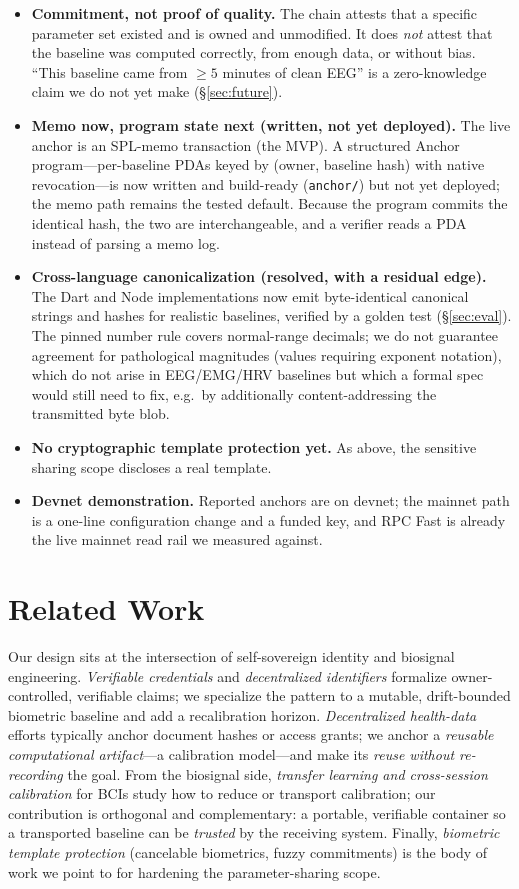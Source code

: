 \documentclass[10pt,twocolumn]{article}
\newcommand{\code}[1]{\texttt{\small #1}}
\begin{document}
\begin{itemize}
\item \textbf{Commitment, not proof of quality.} The chain attests that a
  specific parameter set existed and is owned and unmodified. It does \emph{not}
  attest that the baseline was computed correctly, from enough data, or without
  bias. ``This baseline came from $\ge\!5$ minutes of clean EEG'' is a
  zero-knowledge claim we do not yet make (\S\ref{sec:future}).
\item \textbf{Memo now, program state next (written, not yet deployed).} The
  live anchor is an SPL-memo transaction (the MVP). A structured Anchor
  program---per-baseline PDAs keyed by (owner, baseline hash) with native
  revocation---is now written and build-ready (\code{anchor/}) but not yet
  deployed; the memo path remains the tested default. Because the program
  commits the identical hash, the two are interchangeable, and a verifier reads
  a PDA instead of parsing a memo log.
\item \textbf{Cross-language canonicalization (resolved, with a residual edge).}
  The Dart and Node implementations now emit byte-identical canonical strings
  and hashes for realistic baselines, verified by a golden test
  (\S\ref{sec:eval}). The pinned number rule covers normal-range decimals; we do
  not guarantee agreement for pathological magnitudes (values requiring
  exponent notation), which do not arise in EEG/EMG/HRV baselines but which a
  formal spec would still need to fix, e.g.\ by additionally content-addressing
  the transmitted byte blob.
\item \textbf{No cryptographic template protection yet.} As above, the sensitive
  sharing scope discloses a real template.
\item \textbf{Devnet demonstration.} Reported anchors are on devnet; the mainnet
  path is a one-line configuration change and a funded key, and RPC Fast is
  already the live mainnet read rail we measured against.
\end{itemize}

\section{Related Work}

Our design sits at the intersection of self-sovereign identity and biosignal
engineering. \emph{Verifiable credentials} and \emph{decentralized identifiers}
formalize owner-controlled, verifiable claims; we specialize the pattern to a
mutable, drift-bounded biometric baseline and add a recalibration horizon.
\emph{Decentralized health-data} efforts typically anchor document hashes or
access grants; we anchor a \emph{reusable computational artifact}---a
calibration model---and make its \emph{reuse without re-recording} the goal.
From the biosignal side, \emph{transfer learning and cross-session calibration}
for BCIs study how to reduce or transport calibration; our contribution is
orthogonal and complementary: a portable, verifiable container so a transported
baseline can be \emph{trusted} by the receiving system. Finally, \emph{biometric
template protection} (cancelable biometrics, fuzzy commitments) is the body of
work we point to for hardening the parameter-sharing scope.
\end{document}
